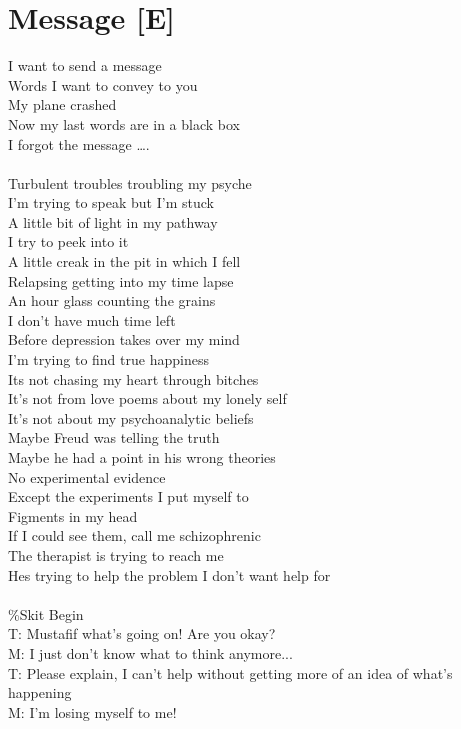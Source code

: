 \documentclass[12pt, b5paper, oneside]{book}
\begin{document}
\section{Message [E]}
I want to send a message
\\Words I want to convey to you
\\My plane crashed
\\Now my last words are in a black box
\\I forgot the message \dots .
%
\\\\Turbulent troubles troubling my psyche
\\I'm trying to speak but I'm stuck
\\A little bit of light in my pathway
\\I try to peek into it
\\A little creak in the pit in which I fell
\\Relapsing getting into my time lapse
\\An hour glass counting the grains
\\I don't have much time left
\\Before depression takes over my mind
\\I'm trying to find true happiness
\\Its not chasing my heart through bitches
\\It's not from love poems about my lonely self
\\It's not about my psychoanalytic beliefs
\\Maybe Freud was telling the truth
\\Maybe he had a point in his wrong theories
\\No experimental evidence
\\Except the experiments I put myself to
\\Figments in my head
\\If I could see them, call me schizophrenic
\\The therapist is trying to reach me
\\Hes trying to help the problem I don't want help for
%
\\\\\%Skit Begin
\\T: Mustafif what's going on! Are you okay?
\\M: I just don't know what to think anymore...
\\T: Please explain, I can't help without getting more of an idea of what's happening
\\M: I'm losing myself to me!
\end{document}
